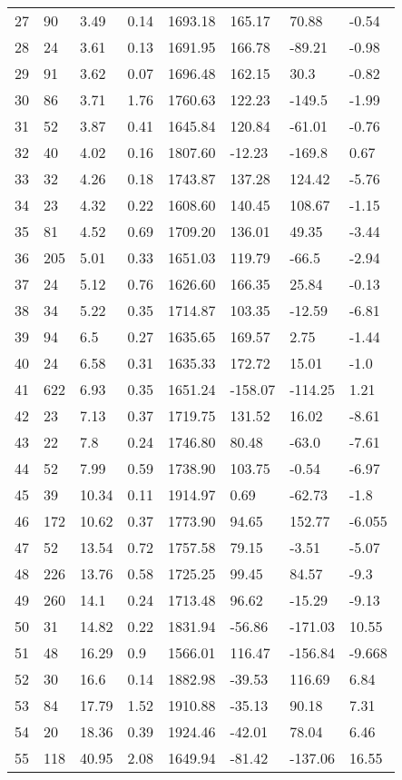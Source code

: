 \documentclass[twocolumn]{aastex631}
\begin{document}
\begin{center}
\begin{longtable}{|l|l|l|l|l|l|l|l|}
27&  90  & 3.49 & 0.14 & 1693.18& 165.17 & 70.88 &  -0.54\\ 
28&  24  & 3.61 & 0.13 & 1691.95& 166.78 & -89.21 &  -0.98\\ 
29&  91  & 3.62 & 0.07 & 1696.48& 162.15 & 30.3  &  -0.82\\ 
30&  86  & 3.71 & 1.76 & 1760.63& 122.23 & -149.5 &  -1.99\\ 
31&  52  & 3.87 & 0.41 & 1645.84& 120.84 & -61.01&  -0.76\\ 
32&  40  & 4.02 & 0.16 & 1807.60 & -12.23&  -169.8 & 0.67\\  
33&  32  & 4.26 & 0.18 & 1743.87& 137.28 & 124.42  &-5.76\\ 
34&  23  & 4.32 & 0.22 & 1608.60 & 140.45&  108.67 & -1.15 \\
35&  81  & 4.52 & 0.69 & 1709.20 & 136.01&  49.35  & -3.44 \\
36&  205  & 5.01 & 0.33 & 1651.03& 119.79 & -66.5   &-2.94  \\
37&  24  & 5.12 & 0.76 & 1626.60 & 166.35&  25.84  & -0.13 \\
38&  34  & 5.22 & 0.35 & 1714.87& 103.35 & -12.59  &-6.81  \\
39&  94  & 6.5  & 0.27 & 1635.65& 169.57 & 2.75    &-1.44  \\
40&  24  & 6.58 & 0.31 & 1635.33& 172.72 & 15.01   &-1.0   \\
41&  622 & 6.93 & 0.35 & 1651.24& -158.07& -114.25 &1.21   \\
42&  23  & 7.13 & 0.37 & 1719.75& 131.52 & 16.02    &-8.61  \\
43&  22  & 7.8  & 0.24 & 1746.80 & 80.48 &  -63.0   & -7.61 \\
44&  52  & 7.99 & 0.59 & 1738.90 & 103.75&  -0.54  & -6.97 \\
45&  39  & 10.34& 0.11 & 1914.97& 0.69   & -62.73   &-1.8   \\
46&  172 & 10.62& 0.37 & 1773.90 & 94.65 &  152.77 & -6.055\\
47&  52  & 13.54& 0.72 & 1757.58& 79.15  & -3.51   &-5.07  \\
48&  226 & 13.76& 0.58 & 1725.25& 99.45  & 84.57   &-9.3   \\
49&  260 & 14.1 & 0.24 & 1713.48& 96.62  & -15.29  &-9.13  \\
50&  31  & 14.82& 0.22 & 1831.94& -56.86 & -171.03  &10.55  \\
51&  48  & 16.29& 0.9  & 1566.01& 116.47 & -156.84 &-9.668 \\
52&  30  & 16.6 & 0.14 & 1882.98& -39.53 & 116.69  &6.84   \\
53&  84  & 17.79& 1.52 & 1910.88& -35.13 & 90.18   &7.31   \\
54&  20  & 18.36& 0.39 & 1924.46& -42.01 & 78.04    &6.46   \\
55&  118  & 40.95& 2.08 & 1649.94& -81.42 & -137.06  &16.55  \\

\end{longtable}
\label{table:table1}
\end{center}
\end{document}
